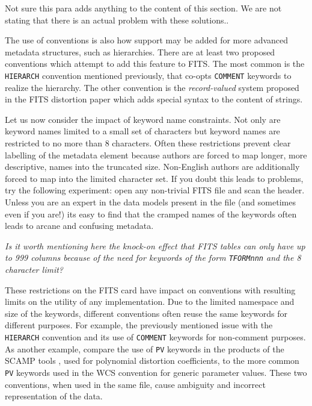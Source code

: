 \documentclass[final,authoryear,5p,times,twocolumn]{elsarticle}
\begin{document}
{{{\color{red} Not sure this para adds anything to the content of this section.
We are not stating that there is an actual problem with these solutions..

The use of conventions is also how support may be added for more
advanced metadata structures, such as hierarchies. There are at 
least two proposed conventions which attempt to add this feature to FITS.
The most common is the \texttt{HIERARCH} convention mentioned previously, 
that co-opts \texttt{COMMENT} keywords to realize the hierarchy. The other 
convention is the \emph{record-valued} system proposed in the FITS 
distortion paper \citep{FITSDistort} which adds special syntax to the 
content of strings. 
}

Let us now consider the impact of keyword name constraints. Not only
are keyword names limited to a small set of characters but keyword
names are restricted to no more than 8 characters. Often these
restrictions prevent clear labelling of the metadata element because
authors are forced to map longer, more descriptive, names into the
truncated size. Non-English authors are additionally forced to map
into the limited character set. If you doubt this leads to problems,
try the following experiment: open any non-trivial FITS file and scan
the header. Unless you are an expert in the data models present in the
file (and sometimes even if you are!) its easy to find that the
cramped names of the keywords often leads to arcane and confusing
metadata.

\textit{\color{red} Is it worth mentioning here the knock-on effect that FITS
tables can only have up to 999 columns because of the need for keywords of the
form \texttt{TFORMnnn} and the 8 character limit?}

These restrictions on the FITS card have impact on conventions with
resulting limits on the utility of any implementation. Due to the limited 
namespace and size of the keywords, different conventions often reuse 
the same keywords for different purposes. For example, the previously 
mentioned issue with the \texttt{HIERARCH} convention and its use of 
\texttt{COMMENT} keywords for non-comment purposes. As another example, 
compare the use of \texttt{PV} keywords in the products of the SCAMP tools
\citep{2006ASPC..351..112B}, used for polynomial distortion coefficients, 
to the more common \texttt{PV} keywords used in the WCS convention for generic
parameter values. These two conventions, when used in the same file,
cause ambiguity and incorrect representation of the data.


}}
\end{document}
